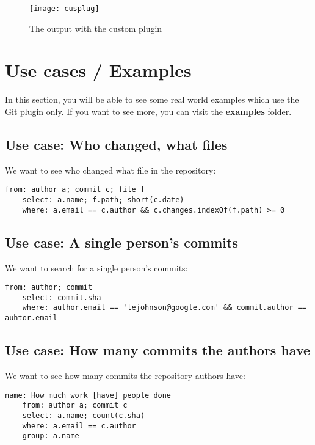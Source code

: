 \begin{figure}[H]
	\centering
	\texttt{[image: cusplug]}
	\caption{The output with the custom plugin}
	\label{fig:fig-cusplug}
\end{figure}


\section{Use cases / Examples}

In this section, you will be able to see some real world examples which use the Git plugin only.
If you want to see more, you can visit the \textbf{examples} folder.

\subsection{Use case: Who changed, what files}

We want to see who changed what file in the repository:

\begin{lstlisting}[caption={whochanged.yaml}]
	from: author a; commit c; file f
	select: a.name; f.path; short(c.date)
	where: a.email == c.author && c.changes.indexOf(f.path) >= 0
\end{lstlisting}

\subsection{Use case: A single person's commits}

We want to search for a single person's commits:

\begin{lstlisting}[caption={authorcommits.yaml}]
	from: author; commit
	select: commit.sha
	where: author.email == 'tejohnson@google.com' && commit.author == auhtor.email
\end{lstlisting}

\subsection{Use case: How many commits the authors have}

We want to see how many commits the repository authors have:

\begin{lstlisting}[caption={howmuchwork.yaml}]
	name: How much work [have] people done
	from: author a; commit c
	select: a.name; count(c.sha)
	where: a.email == c.author
	group: a.name
\end{lstlisting}
